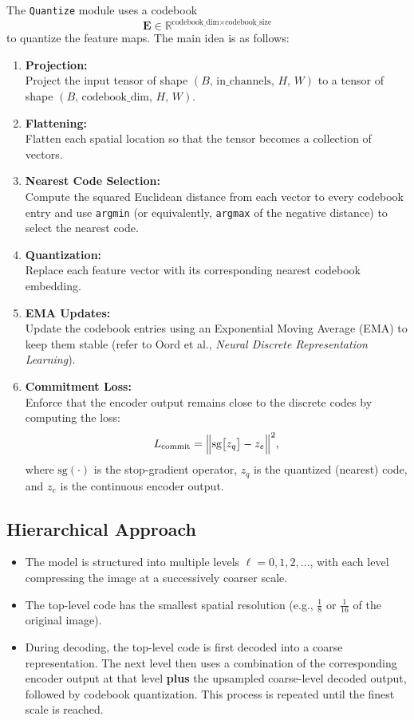 \documentclass[11pt]{article}
\begin{document}
The \texttt{Quantize} module uses a codebook 
\[
\mathbf{E} \in \mathbb{R}^{\text{codebook\_dim} \times \text{codebook\_size}}
\]
to quantize the feature maps. The main idea is as follows:

\begin{enumerate}
  \item \textbf{Projection:} \\
    Project the input tensor of shape \((B,\, \text{in\_channels},\, H,\, W)\) to a tensor of shape \((B,\, \text{codebook\_dim},\, H,\, W)\).
  \item \textbf{Flattening:} \\
    Flatten each spatial location so that the tensor becomes a collection of vectors.
  \item \textbf{Nearest Code Selection:} \\
    Compute the squared Euclidean distance from each vector to every codebook entry and use \texttt{argmin} (or equivalently, \texttt{argmax} of the negative distance) to select the nearest code.
  \item \textbf{Quantization:} \\
    Replace each feature vector with its corresponding nearest codebook embedding.
  \item \textbf{EMA Updates:} \\
    Update the codebook entries using an Exponential Moving Average (EMA) to keep them stable (refer to Oord et al., \emph{Neural Discrete Representation Learning}).
  \item \textbf{Commitment Loss:} \\
    Enforce that the encoder output remains close to the discrete codes by computing the loss:
    \[
    L_{\text{commit}} = \Bigl\|\text{sg}\bigl[z_q\bigr] - z_e\Bigr\|^2,
    \]
    where \(\text{sg}(\cdot)\) is the stop-gradient operator, \(z_q\) is the quantized (nearest) code, and \(z_e\) is the continuous encoder output.
\end{enumerate}

\subsection{Hierarchical Approach}

\begin{itemize}
  \item The model is structured into multiple levels \(\ell = 0, 1, 2, \dots\), with each level compressing the image at a successively coarser scale.
  \item The top-level code has the smallest spatial resolution (e.g., \(\frac{1}{8}\) or \(\frac{1}{16}\) of the original image).
  \item During decoding, the top-level code is first decoded into a coarse representation. The next level then uses a combination of the corresponding encoder output at that level \textbf{plus} the upsampled coarse-level decoded output, followed by codebook quantization. This process is repeated until the finest scale is reached.
\end{itemize}
\end{document}
